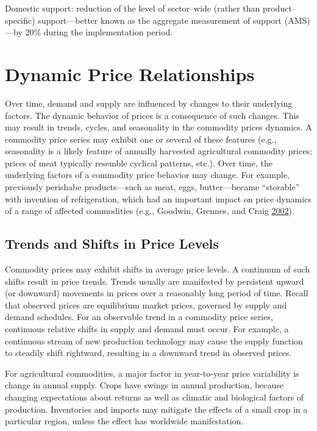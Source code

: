 \documentclass[]{book}
\begin{document}
Domestic support: reduction of the level of sector--wide (rather than
product--specific) support---better known as the aggregate measurement
of support (AMS)---by 20\% during the implementation period.

\chapter{Dynamic Price Relationships}\label{dynamic-price-relationships}

Over time, demand and supply are influenced by changes to their
underlying factors. The dynamic behavior of prices is a consequence of
such changes. This may result in trends, cycles, and seasonality in the
commodity prices dynamics. A commodity price series may exhibit one or
several of these features (e.g., seasonality is a likely feature of
annually harvested agricultural commodity prices; prices of meat
typically resemble cyclical patterns, etc.). Over time, the underlying
factors of a commodity price behavior may change. For example,
previously perishabe products---such as meat, eggs, butter---became
``storable'' with invention of refrigeration, which had an important
impact on price dynamics of a range of affected commodities (e.g.,
Goodwin, Grennes, and Craig \protect\hyperlink{ref-goodwin2002}{2002}).

\section{Trends and Shifts in Price
Levels}\label{trends-and-shifts-in-price-levels}

Commodity prices may exhibit shifts in average price levels. A continuum
of such shifts result in price trends. Trends usually are manifested by
persistent upward (or downward) movements in prices over a reasonably
long period of time. Recall that observed prices are equilibrium market
prices, governed by supply and demand schedules. For an observable trend
in a commodity price series, continuous relative shifts in supply and
demand must occur. For example, a continuous stream of new production
technology may cause the supply function to steadily shift rightward,
resulting in a downward trend in observed prices.

For agricultural commodities, a major factor in year-to-year price
variability is change in annual supply. Crops have swings in annual
production, because changing expectations about returns as well as
climatic and biological factors of production. Inventories and imports
may mitigate the effects of a small crop in a particular region, unless
the effect has worldwide manifestation.
\end{document}
